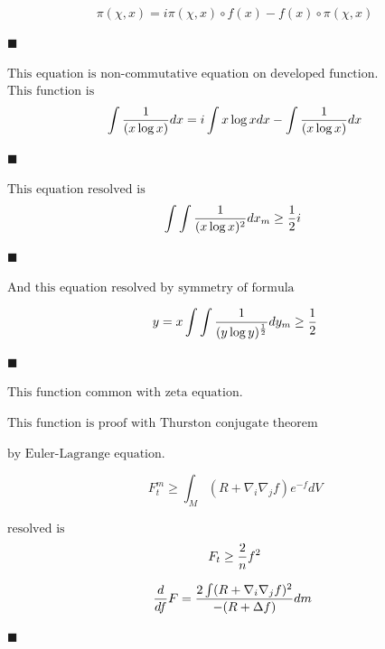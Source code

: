 \documentclass{jsarticle}
\begin{document}
\begin{equation}
\pi(\chi,x) = i \pi (\chi,x) \circ f(x) - f(x) \circ \pi (\chi, x) 
\end{equation}
\begin{flushright}
$ \blacksquare $
\end{flushright}
		

$\text{This equation is non-commutative equation on developed function.}$
$\text{This function is}$ 
\begin{equation}
\int {1 \over (x \log x)}dx = i \int x \log xdx - \int {1 \over (x \log x)}dx 
\end{equation}
\begin{flushright}
$\blacksquare $
\end{flushright}

$\text{This equation resolved is}$
\begin{equation}
\int \int {1 \over (x \log x)^2}dx_{m} \ge {1 \over 2}i \   
\end{equation}
\begin{flushright}
$ \blacksquare $
\end{flushright}

$\text{And this equation resolved by symmetry of formula}$

\begin{equation}
    y = x 
   \int \int {1 \over (y \log y)^{1 \over 2}}dy_{m} \ge {1 \over 2} 
\end{equation}
\begin{flushright}
$\blacksquare$
\end{flushright}

$\text{This function common with zeta equation.}$


$\text{This function is proof with Thurston conjugate theorem}$


$\text{by Euler-Lagrange equation.}$

\begin{equation}
 F^m_{t} \ge \int_{M} (R + \nabla_{i} \nabla_{j} f)e^{-f}dV 
\end{equation}

$\text{resolved is}$
\begin{equation}
	F_{t} \ge {2 \over n}f^2  
\end{equation}

\begin{equation}
   {d \over df}F = {2 \int (R + \nabla_{i} \nabla_{j} f)^2 \over - (R + \Delta f)}dm \   
\end{equation}
\begin{flushright}
$\blacksquare$
\end{flushright}
\end{document}

